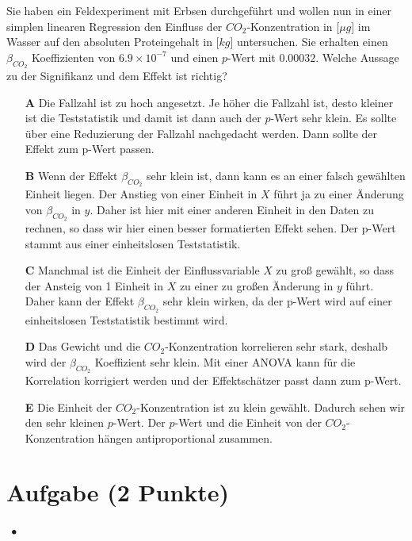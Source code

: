 \documentclass[a4paper, 9pt]{scrartcl}\usepackage[]{graphicx}\usepackage[]{xcolor}
\begin{document}
Sie haben ein Feldexperiment mit Erbsen durchgeführt und wollen nun in einer simplen linearen Regression den Einfluss der $CO_2$-Konzentration in [$\mu g$] im Wasser auf den absoluten Proteingehalt in [$kg$] untersuchen. Sie erhalten einen $\beta_{CO_2}$ Koeffizienten von $6.9\times 10^{-7}$ und einen $p$-Wert mit $0.00032$. Welche Aussage zu der Signifikanz und dem Effekt ist richtig?




\begin{enumerate}
\item [\textbf{A} \msquare] Die Fallzahl ist zu hoch angesetzt. Je höher die Fallzahl ist, desto kleiner ist die Teststatistik und damit ist dann auch der $p$-Wert sehr klein. Es sollte über eine Reduzierung der Fallzahl nachgedacht werden. Dann sollte der Effekt zum p-Wert passen.
\item [\textbf{B} \msquare] Wenn der Effekt $\beta_{CO_2}$ sehr klein ist, dann kann es an einer falsch gewählten Einheit liegen. Der Anstieg von einer Einheit in $X$ führt ja zu einer Änderung von $\beta_{CO_2}$ in $y$. Daher ist hier mit einer anderen Einheit in den Daten zu rechnen, so dass wir hier einen besser formatierten Effekt sehen. Der p-Wert stammt aus einer einheitslosen Teststatistik.
\item [\textbf{C} \msquare] Manchmal ist die Einheit der Einflussvariable $X$ zu groß gewählt, so dass der Ansteig von 1 Einheit in $X$ zu einer zu großen Änderung in $y$ führt. Daher kann der Effekt $\beta_{CO_2}$ sehr klein wirken, da der p-Wert wird auf einer einheitslosen Teststatistik bestimmt wird.
\item [\textbf{D} \msquare] Das Gewicht und die $CO_2$-Konzentration korrelieren sehr stark, deshalb wird der $\beta_{CO_2}$ Koeffizient sehr klein. Mit einer ANOVA kann für die Korrelation korrigiert werden und der Effektschätzer passt dann zum p-Wert.
\item [\textbf{E} \msquare] Die Einheit der $CO_2$-Konzentration ist zu klein gewählt. Dadurch sehen wir den sehr kleinen $p$-Wert. Der $p$-Wert und die Einheit von der $CO_2$-Konzentration hängen antiproportional zusammen.
\end{enumerate} 

\section{Aufgabe \hfill (2 Punkte)}

\ifcollection
\begin{flushright}
\tiny\vspace{-2Ex}
\textbf{\examinhaltstart}
\exammodulestatversuch $\;\bullet$
\exammodulebiostat
\vspace{-1Ex}
\end{flushright}
\fi
\end{document}
